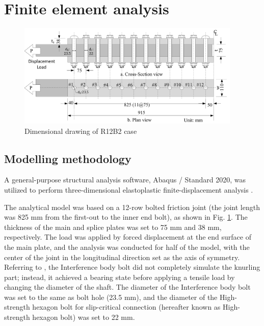 \section{Finite element analysis}

\begin{figure}[htbp]
    \centering
    \includegraphics[width=0.95\textwidth]{imgs/ch5/femodelsize.pdf}
    \caption{Dimensional drawing of R12B2 case}
    \label{fig-modelsize}
\end{figure}

\subsection{Modelling methodology}

A general-purpose structural analysis software, Abaqus / Standard 2020, was utilized to perform three-dimensional elastoplastic finite-displacement analysis \cite{Smith2020}. \par
The analytical model was based on a 12-row bolted friction joint (the joint length was 825 mm from the first-out to the inner end bolt), as shown in Fig. \ref{fig-modelsize}. The thickness of the main and splice plates was set to 75 mm and 38 mm, respectively. The load was applied by forced displacement at the end surface of the main plate, and the analysis was conducted for half of the model, with the center of the joint in the longitudinal direction set as the axis of symmetry. Referring to \cite{Shimozato2008ExperrimentalModel}, the Interference body bolt did not completely simulate the knurling part; instead, it achieved a bearing state before applying a tensile load by changing the diameter of the shaft. The diameter of the Interference body bolt was set to the same as bolt hole (23.5 mm), and the diameter of the High-strength hexagon bolt for slip-critical connection (hereafter known as High-strength hexagon bolt) was set to 22 mm. \par

